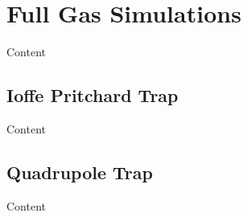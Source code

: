 
\section{Full Gas Simulations}

Content


\subsection{Ioffe Pritchard Trap}

Content


\subsection{Quadrupole Trap}

Content